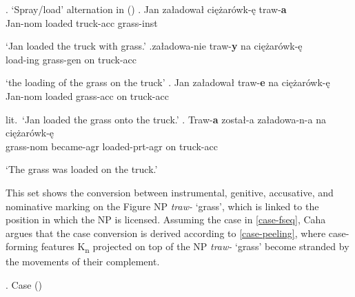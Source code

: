 \ex.\label{trawa} `Spray/load' alternation in  (\citealt[241--242]{Wiland-NELS48})
\ag. Jan za\l adowa\l {}  ci\k{e}\.zar\'owk-\k{e} traw-\k{\bf{a}}\label{aaa}\\
Jan-{\sc nom} loaded truck-{\sc acc} grass-{\sc inst} \\
\strut `Jan loaded the truck with grass.'
\bg.\label{gen}za\l adowa-nie traw-{\bf{y}} na ci\k{e}\.zar\'owk-\k{e}\\
load-{\sc ing} grass-{\sc gen} on truck-{\sc acc}\\
\strut  `the loading of the grass on the truck'
\cg. Jan za\l adowa\l {} traw-\k{\bf{e}} na ci\k{e}\.zar\'owk-\k{e}\label{bbb}\\
Jan-{\sc nom} loaded grass-{\sc acc} on truck-{\sc acc}\\
\strut  lit.\ `Jan loaded the grass onto the truck.'
\dg. Traw-{\bf a} zosta\l-a za\l adowa-n-a na ci\k{e}\.zar\'owk-\k{e}\\
grass-{\sc nom} became-{\sc agr} loaded-{\sc prt-agr} on truck-{\sc acc} \\
\strut `The grass was loaded on the truck.'

This set shows the conversion between instrumental, genitive, accusative, and nominative marking on the Figure NP \textit{traw-} `grass', which is linked to the position in which the NP is licensed.    
Assuming the case  in \ref{case-fseq}, Caha argues that the case conversion is derived according to \ref{case-peeling}, where case-forming features K\textsubscript{n} projected on top of the NP \textit{traw-} `grass' become stranded by the movements of their complement. 

\ex. \label{case-peeling}Case  (\citealt[142--145]{Caha2009})

\vskip -0.5cm
\hskip -1cm 

